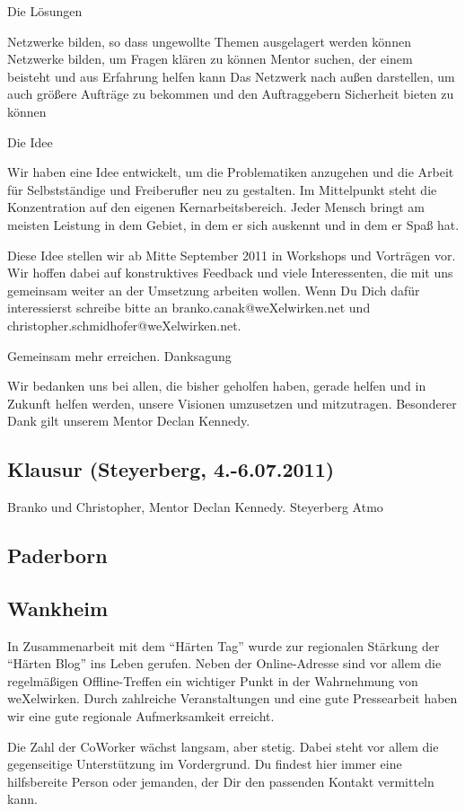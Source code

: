 \begin{appendix}
Die Lösungen

    Netzwerke bilden, so dass ungewollte Themen ausgelagert werden können
    Netzwerke bilden, um Fragen klären zu können
    Mentor suchen, der einem beisteht und aus Erfahrung helfen kann
    Das Netzwerk nach außen darstellen, um auch größere Aufträge zu bekommen und den Auftraggebern Sicherheit bieten zu können

Die Idee

Wir haben eine Idee entwickelt, um die Problematiken anzugehen und die Arbeit für Selbstständige und Freiberufler neu zu gestalten. Im Mittelpunkt steht die Konzentration auf den eigenen Kernarbeitsbereich. Jeder Mensch bringt am meisten Leistung in dem Gebiet, in dem er sich auskennt und in dem er Spaß hat.

Diese Idee stellen wir ab Mitte September 2011 in Workshops und Vorträgen vor. Wir hoffen dabei auf konstruktives Feedback und viele Interessenten, die mit uns gemeinsam weiter an der Umsetzung arbeiten wollen. Wenn Du Dich dafür interessierst schreibe bitte an branko.canak@weXelwirken.net und christopher.schmidhofer@weXelwirken.net.

Gemeinsam mehr erreichen.
Danksagung

Wir bedanken uns bei allen, die bisher geholfen haben, gerade helfen und in Zukunft helfen werden, unsere Visionen umzusetzen und mitzutragen. Besonderer Dank gilt unserem Mentor Declan Kennedy.

\grqq
    \subsection{Klausur (Steyerberg, 4.-6.07.2011)}
Branko und Christopher, Mentor Declan Kennedy. Steyerberg Atmo

    \subsection{Paderborn}
    \subsection{Wankheim}
In Zusammenarbeit mit dem "`Härten Tag"' wurde zur regionalen Stärkung der "`Härten Blog"' ins Leben gerufen. Neben der Online-Adresse sind vor allem die regelmäßigen Offline-Treffen ein wichtiger Punkt in der Wahrnehmung von weXelwirken. Durch zahlreiche Veranstaltungen und eine gute Pressearbeit haben wir eine gute regionale Aufmerksamkeit erreicht.

Die Zahl der CoWorker wächst langsam, aber stetig. Dabei steht vor allem die gegenseitige Unterstützung im Vordergrund. Du findest hier immer eine hilfsbereite Person oder jemanden, der Dir den passenden Kontakt vermitteln kann.


\end{appendix}

